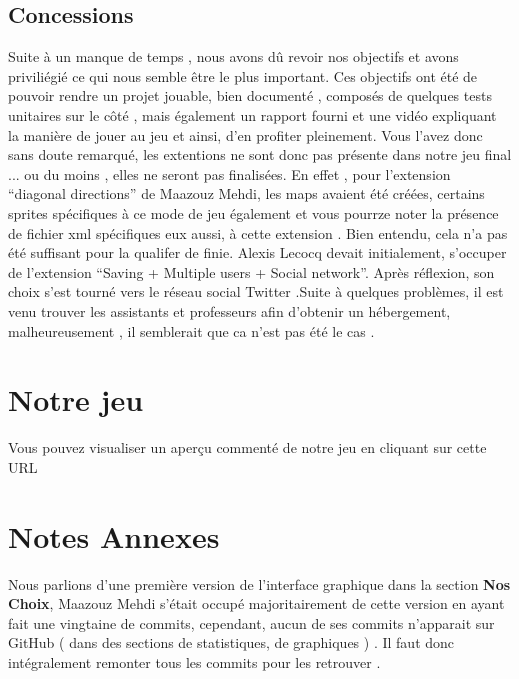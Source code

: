 \documentclass[a4paper,10pt]{article}
\begin{document}
\subsection{Concessions}
Suite à un manque de temps , nous avons dû revoir nos objectifs et avons priviliégié ce qui nous semble être le plus important. 
Ces objectifs ont été de pouvoir rendre un projet jouable, bien documenté , composés de quelques tests unitaires sur le côté , mais 
également un rapport fourni et une vidéo expliquant la manière de jouer au jeu et ainsi, d'en profiter pleinement. 
Vous l'avez donc sans doute remarqué, les extentions ne sont donc pas présente dans notre jeu final ... ou du moins , elles ne seront pas finalisées.
En effet , pour l'extension ``diagonal directions'' de Maazouz Mehdi, les maps avaient été créées, certains sprites spécifiques à ce mode de jeu également
et vous pourrze noter la présence de fichier xml spécifiques eux aussi, à cette extension . Bien entendu, cela n'a pas été suffisant pour la qualifer de finie.
Alexis Lecocq devait initialement, s'occuper de l'extension ``Saving + Multiple users + Social network''. Après réflexion, son choix
s'est tourné vers le réseau social Twitter .Suite à quelques problèmes, il est venu trouver les assistants et professeurs afin d'obtenir un hébergement,
malheureusement , il semblerait que ca n'est pas été le cas .

\section{Notre jeu}
Vous pouvez visualiser un aperçu commenté de notre jeu en cliquant sur cette URL

\section{Notes Annexes}
Nous parlions d'une première version de l'interface graphique dans la section \textbf{Nos Choix}, Maazouz Mehdi s'était occupé majoritairement
de cette version en ayant fait une vingtaine de commits, cependant, aucun de ses commits n'apparait sur GitHub ( dans des sections de statistiques, 
de graphiques ) . Il faut donc intégralement remonter tous les commits pour les retrouver .
\end{document}

